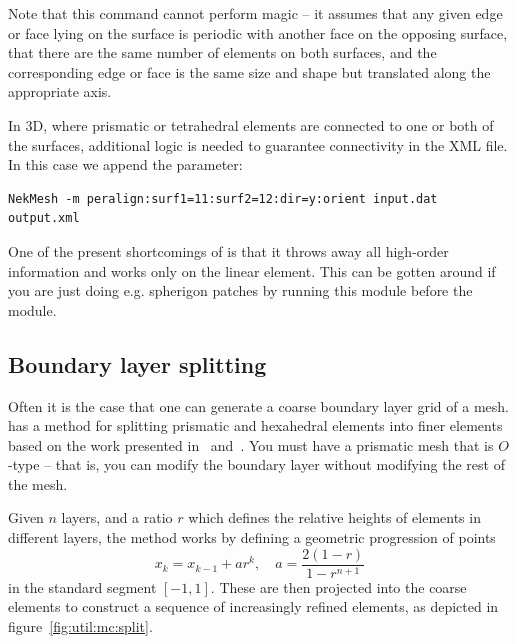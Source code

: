 Note that this command cannot perform magic -- it assumes that any given edge or
face lying on the surface is periodic with another face on the opposing surface,
that there are the same number of elements on both surfaces, and the
corresponding edge or face is the same size and shape but translated along the
appropriate axis.

In 3D, where prismatic or tetrahedral elements are connected to one or both of
the surfaces, additional logic is needed to guarantee connectivity in the XML
file. In this case we append the  parameter:
%
\begin{lstlisting}[style=BashInputStyle]
NekMesh -m peralign:surf1=11:surf2=12:dir=y:orient input.dat output.xml
\end{lstlisting}

\begin{notebox}
  One of the present shortcomings of  is that it throws away all
  high-order information and works only on the linear element. This can be
  gotten around if you are just doing e.g. spherigon patches by running this
   module before the  module.
\end{notebox}

\subsection{Boundary layer splitting}

Often it is the case that one can generate a coarse boundary layer grid of a
mesh. \mc has a method for splitting prismatic and hexahedral elements into
finer elements based on the work presented in~\cite{MoHaPeSh14}
and~\cite{MoHaPeSh14b}. You must have a prismatic mesh that is $O$-type -- that
is, you can modify the boundary layer without modifying the rest of the mesh.

Given $n$ layers, and a ratio $r$ which defines the relative heights of elements
in different layers, the method works by defining a geometric progression of
points
\[
x_k = x_{k-1} + ar^k, \quad a = \frac{2(1-r)}{1 - r^{n+1}}
\]
in the standard segment $[-1,1]$. These are then projected into the coarse
elements to construct a sequence of increasingly refined elements, as depicted
in figure~\ref{fig:util:mc:split}.

